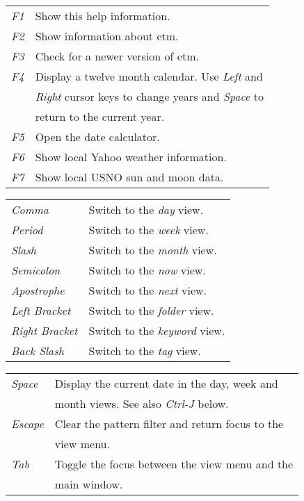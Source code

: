 \documentclass[10pt,landscape]{article}
\begin{document}
\begin{multicols}{3}
\begin{tabular}{@{}ll@{}}
\emph{F1} & Show this help information. \\
\emph{F2}               & Show information about etm. \\
\emph{F3}               & Check for a newer version of etm. \\
\emph{F4}               & Display a twelve month calendar. Use \emph{Left} and \\
                        & \emph{Right} cursor keys to change years and \emph{Space} to \\
                        & return to the current year. \\
\emph{F5}               & Open the date calculator. \\
\emph{F6}               & Show local Yahoo weather information. \\
\emph{F7}               & Show local USNO sun and moon data. \\
\end{tabular}
\begin{tabular}{@{}ll@{}}
\emph{Comma}            & Switch to the \emph{day} view. \\
\emph{Period}           & Switch to the \emph{week} view. \\
\emph{Slash}            & Switch to the \emph{month} view. \\
\emph{Semicolon}        & Switch to the \emph{now} view. \\
\emph{Apostrophe}       & Switch to the \emph{next} view. \\
\emph{Left Bracket}     & Switch to the \emph{folder} view. \\
\emph{Right Bracket}    & Switch to the \emph{keyword} view. \\
\emph{Back Slash}       & Switch to the \emph{tag} view. \\
\end{tabular}
\begin{tabular}{@{}ll@{}}
\emph{Space}         & Display the current date in the day, week and \\
                        & month views. See also \emph{Ctrl-J} below. \\
\emph{Escape}           & Clear the pattern filter and return focus to the \\
                        & view menu. \\
\emph{Tab}              & Toggle the focus between the view menu and the \\
                        & main window. \\

\end{tabular}
\end{multicols}
\end{document}
